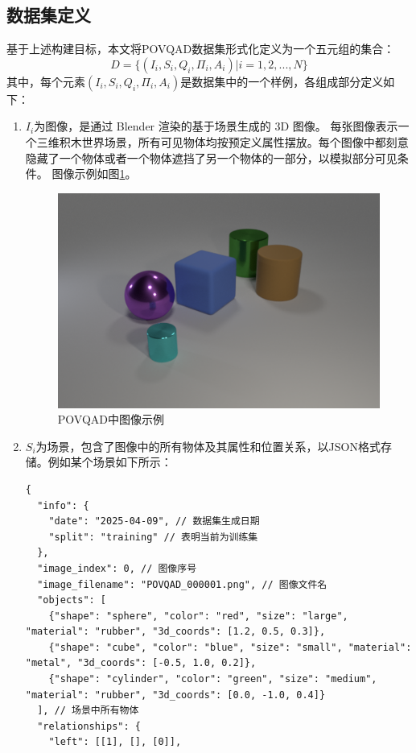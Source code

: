 \subsection{数据集定义}
基于上述构建目标，本文将POVQAD数据集形式化定义为一个五元组的集合：
$$D = \{ (I_i,S_i,Q_i,\Pi_i ,A_i) | i=1,2,...,N \}$$
其中，每个元素$(I_i,S_i,Q_i,\Pi_i ,A_i)$是数据集中的一个样例，各组成部分定义如下：
\begin{enumerate}[nosep]
\item \textbf{$I_i$}为图像，是通过 Blender 渲染的基于场景生成的 3D 图像。
每张图像表示一个三维积木世界场景，所有可见物体均按预定义属性摆放。每个图像中都刻意隐藏了一个物体或者一个物体遮挡了另一个物体的一部分，以模拟部分可见条件。
图像示例如图\ref{POVQAD-figure}。
\begin{figure}[H]
\centering
\includegraphics[scale=0.35]{figures/POVQAD中图像示例.png}
\caption{POVQAD中图像示例}
\label{POVQAD-figure}
\end{figure}
\item \textbf{$S_i$}为场景，包含了图像中的所有物体及其属性和位置关系，以JSON格式存储。例如某个场景如下所示：
\begin{lstlisting}
{
  "info": {
    "date": "2025-04-09", // 数据集生成日期
    "split": "training" // 表明当前为训练集
  },
  "image_index": 0, // 图像序号
  "image_filename": "POVQAD_000001.png", // 图像文件名
  "objects": [
    {"shape": "sphere", "color": "red", "size": "large", "material": "rubber", "3d_coords": [1.2, 0.5, 0.3]},
    {"shape": "cube", "color": "blue", "size": "small", "material": "metal", "3d_coords": [-0.5, 1.0, 0.2]},
    {"shape": "cylinder", "color": "green", "size": "medium", "material": "rubber", "3d_coords": [0.0, -1.0, 0.4]}
  ], // 场景中所有物体
  "relationships": {
    "left": [[1], [], [0]],

\end{lstlisting}
\end{enumerate}
